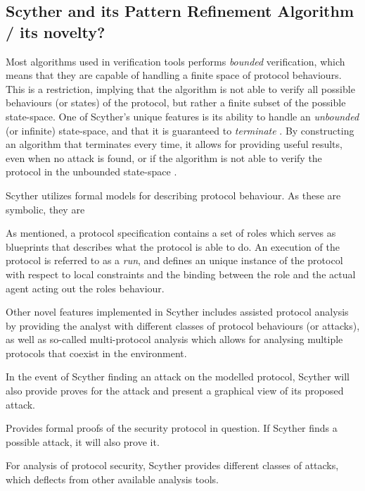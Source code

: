 \subsection{Scyther and its Pattern Refinement Algorithm / its novelty?}

Most algorithms used in verification tools performs \emph{bounded} verification, which means that they are capable of handling a finite space of protocol behaviours. This is a restriction, implying that the algorithm is not able to verify all possible behaviours (or states) of the protocol, but rather a finite subset of the possible state-space. One of Scyther's unique features is its ability to handle an \emph{unbounded} (or infinite) state-space, and that it is guaranteed to \emph{terminate} \cite{cremers2008unbounded}. By constructing an algorithm that terminates every time, it allows for providing useful results, even when no attack is found, or if the algorithm is not able to verify the protocol in the unbounded state-space \cite{cremers2008scyther}.

Scyther utilizes formal models for describing protocol behaviour. As these are symbolic, they are 



As mentioned, a protocol specification contains a set of roles which serves as blueprints that describes what the protocol is able to do. An execution of the protocol is referred to as a \emph{run}, and defines an unique instance of the protocol with respect to local constraints and the binding between the role and the actual agent acting out the roles behaviour. 

Other novel features implemented in Scyther includes assisted protocol analysis by providing the analyst with different classes of protocol behaviours (or attacks), as well as so-called multi-protocol analysis which allows for analysing multiple protocols that coexist in the environment.



In the event of Scyther finding an attack on the modelled protocol, Scyther will also provide proves for the attack and present a graphical view of its proposed attack.

Provides formal proofs of the security protocol in question. If Scyther finds a possible attack, it will also prove it.



For analysis of protocol security, Scyther provides different classes of attacks, which deflects from other available analysis tools.





